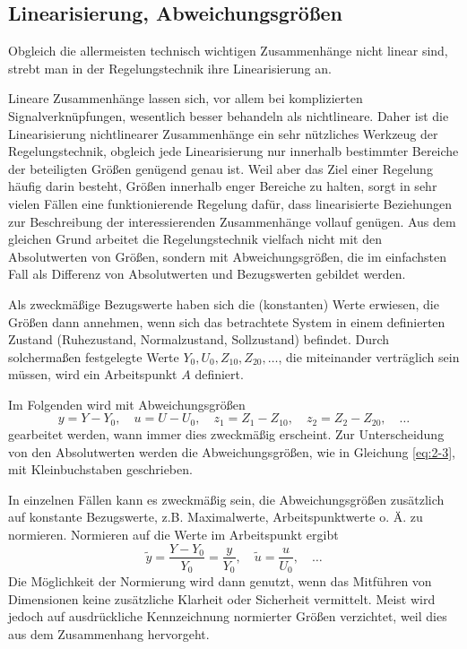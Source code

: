 \subsection{Linearisierung, Abweichungsgrößen}

Obgleich die allermeisten technisch wichtigen Zusammenhänge nicht linear sind, strebt man in der Regelungstechnik ihre Linearisierung an.

Lineare Zusammenhänge lassen sich, vor allem bei komplizierten Signalverknüpfungen, wesentlich besser behandeln als nichtlineare.
Daher ist die Linearisierung nichtlinearer Zusammenhänge ein sehr nützliches Werkzeug der Regelungstechnik, obgleich jede Linearisierung nur innerhalb bestimmter Bereiche der beteiligten Größen genügend genau ist.
Weil aber das Ziel einer Regelung häufig darin besteht, Größen innerhalb enger Bereiche zu halten, sorgt in sehr vielen Fällen eine funktionierende Regelung dafür, dass linearisierte Beziehungen zur Beschreibung der interessierenden Zusammenhänge vollauf genügen.
Aus dem gleichen Grund arbeitet die Regelungstechnik vielfach nicht mit den Absolutwerten von Größen, sondern mit Abweichungsgrößen, die im einfachsten Fall als Differenz von Absolutwerten und Bezugswerten gebildet werden.

Als zweckmäßige Bezugswerte haben sich die (konstanten) Werte erwiesen, die Größen dann annehmen, wenn sich das betrachtete System in einem definierten Zustand (Ruhezustand, Normalzustand, Sollzustand) befindet.
Durch solchermaßen festgelegte Werte \(Y_0, U_0, Z_{10}, Z_{20}, \ldots\), die miteinander verträglich sein müssen, wird ein Arbeitspunkt \(A\) definiert.

Im Folgenden wird mit Abweichungsgrößen
\begin{equation}\label{eq:2-3}
    y = Y - Y_0, \quad u = U - U_0, \quad z_1 = Z_1 - Z_{10}, \quad z_2 = Z_2 - Z_{20}, \quad \ldots
\end{equation}
gearbeitet werden, wann immer dies zweckmäßig erscheint.
Zur Unterscheidung von den Absolutwerten werden die Abweichungsgrößen, wie in Gleichung \eqref{eq:2-3}, mit Kleinbuchstaben geschrieben.

In einzelnen Fällen kann es zweckmäßig sein, die Abweichungsgrößen zusätzlich auf konstante Bezugswerte, z.B. Maximalwerte, Arbeitspunktwerte o. Ä. zu normieren.
Normieren auf die Werte im Arbeitspunkt ergibt
\begin{equation}
    \tilde{y} = \frac{Y - Y_0}{Y_0} = \frac{y}{Y_0}, \quad \tilde{u} = \frac{u}{U_0}, \quad \ldots
\end{equation}
Die Möglichkeit der Normierung wird dann genutzt, wenn das Mitführen von Dimensionen keine zusätzliche Klarheit oder Sicherheit vermittelt.
Meist wird jedoch auf ausdrückliche Kennzeichnung normierter Größen verzichtet, weil dies aus dem Zusammenhang hervorgeht.

